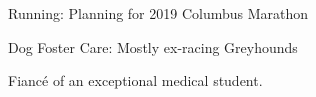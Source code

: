 

\begin{cvitems}

	\vspace{4.0mm}
  	\item
    {Running: Planning for 2019 Columbus Marathon}
	\item
	{Dog Foster Care: Mostly ex-racing Greyhounds}
	\item
	{Fiancé of an exceptional medical student.}


\end{cvitems}

